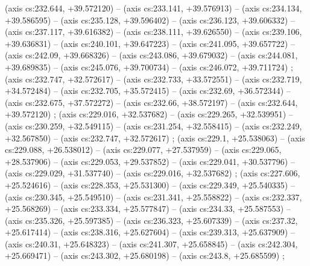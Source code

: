     (axis cs:232.644,    +39.572120) --  (axis cs:233.141,    +39.576913) --  (axis cs:234.134,    +39.586595) --  (axis cs:235.128,    +39.596402) --  (axis cs:236.123,    +39.606332) --  (axis cs:237.117,    +39.616382) --  (axis cs:238.111,    +39.626550) --  (axis cs:239.106,    +39.636831) --  (axis cs:240.101,    +39.647223) --  (axis cs:241.095,    +39.657722) --  (axis cs:242.09,    +39.668326) --  (axis cs:243.086,    +39.679032) --  (axis cs:244.081,    +39.689835) --  (axis cs:245.076,    +39.700734) --  (axis cs:246.072,    +39.711724) ;
    (axis cs:232.747,    +32.572617) --  (axis cs:232.733,    +33.572551) --  (axis cs:232.719,    +34.572484) --  (axis cs:232.705,    +35.572415) --  (axis cs:232.69,    +36.572344) --  (axis cs:232.675,    +37.572272) --  (axis cs:232.66,    +38.572197) --  (axis cs:232.644,    +39.572120) ;
    (axis cs:229.016,    +32.537682) --  (axis cs:229.265,    +32.539951) --  (axis cs:230.259,    +32.549115) --  (axis cs:231.254,    +32.558415) --  (axis cs:232.249,    +32.567850) --  (axis cs:232.747,    +32.572617) ;
    (axis cs:229.1,    +25.538063) --  (axis cs:229.088,    +26.538012) --  (axis cs:229.077,    +27.537959) --  (axis cs:229.065,    +28.537906) --  (axis cs:229.053,    +29.537852) --  (axis cs:229.041,    +30.537796) --  (axis cs:229.029,    +31.537740) --  (axis cs:229.016,    +32.537682) ;
    (axis cs:227.606,    +25.524616) --  (axis cs:228.353,    +25.531300) --  (axis cs:229.349,    +25.540335) --  (axis cs:230.345,    +25.549510) --  (axis cs:231.341,    +25.558822) --  (axis cs:232.337,    +25.568269) --  (axis cs:233.334,    +25.577847) --  (axis cs:234.33,    +25.587553) --  (axis cs:235.326,    +25.597385) --  (axis cs:236.323,    +25.607339) --  (axis cs:237.32,    +25.617414) --  (axis cs:238.316,    +25.627604) --  (axis cs:239.313,    +25.637909) --  (axis cs:240.31,    +25.648323) --  (axis cs:241.307,    +25.658845) --  (axis cs:242.304,    +25.669471) --  (axis cs:243.302,    +25.680198) --  (axis cs:243.8,    +25.685599) ;
